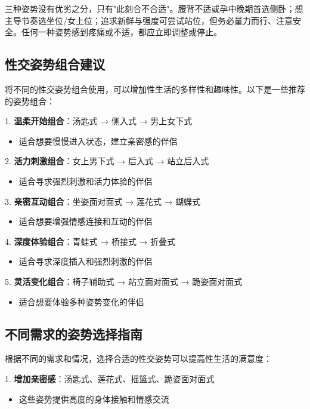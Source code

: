 \documentclass[12pt,UTF8]{ctexbook}
\begin{document}
\begin{tcolorbox}[colback=pink!5!white,colframe=red!50!black,title=贴心小叮咛]
	三种姿势没有优劣之分，只有"此刻合不合适"。腰背不适或孕中晚期首选侧卧；想主导节奏选坐位/女上位；追求新鲜与强度可尝试站位，但务必量力而行、注意安全。任何一种姿势感到疼痛或不适，都应立即调整或停止。
\end{tcolorbox}

\subsection{性交姿势组合建议}

将不同的性交姿势组合使用，可以增加性生活的多样性和趣味性。以下是一些推荐的姿势组合：

1. \textbf{温柔开始组合}：汤匙式 → 侧入式 → 男上女下式
\begin{itemize}
	\item 适合想要慢慢进入状态，建立亲密感的伴侣
\end{itemize}

2. \textbf{活力刺激组合}：女上男下式 → 后入式 → 站立后入式
\begin{itemize}
	\item 适合寻求强烈刺激和活力体验的伴侣
\end{itemize}

3. \textbf{亲密互动组合}：坐姿面对面式 → 莲花式 → 蝴蝶式
\begin{itemize}
	\item 适合想要增强情感连接和互动的伴侣
\end{itemize}

4. \textbf{深度体验组合}：青蛙式 → 桥接式 → 折叠式
\begin{itemize}
	\item 适合寻求深度插入和强烈刺激的伴侣
\end{itemize}

5. \textbf{灵活变化组合}：椅子辅助式 → 站立面对面式 → 跪姿面对面式
\begin{itemize}
	\item 适合想要体验多种姿势变化的伴侣
\end{itemize}

\subsection{不同需求的姿势选择指南}

根据不同的需求和情况，选择合适的性交姿势可以提高性生活的满意度：

1. \textbf{增加亲密感}：汤匙式、莲花式、摇篮式、跪姿面对面式
\begin{itemize}
	\item 这些姿势提供高度的身体接触和情感交流
\end{itemize}
\end{document}
